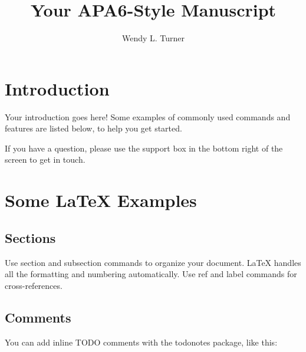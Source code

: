 \documentclass[letter,man,noextraspace,floatsintext]{apa6}
\title{Your APA6-Style Manuscript}
\author{Wendy L. Turner}
\affiliation{Abilene Christian University}
\begin{document}
\maketitle

\section{Introduction}

\parencite{elliott_effective_2014}
\parencite{lawrence_understanding_2017}

Your introduction goes here! Some examples of commonly used commands and features are listed below, to help you get started.

If you have a question, please use the support box in the bottom right of the screen to get in touch. 

\section{Some \LaTeX{} Examples}
\label{sec:examples}

\subsection{Sections}

Use section and subsection commands to organize your document. \LaTeX{} handles all the formatting and numbering automatically. Use ref and label commands for cross-references.

\subsection{Comments}

You can add inline TODO comments with the todonotes package, like this:
\end{document}

